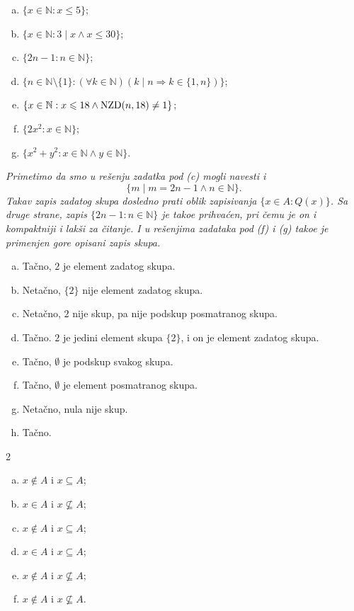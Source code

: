 {
\begin{enumerate}[(a)]
\item $\{ x\in\mathbb N :  x\leq 5 \}$;
\item $\{ x\in\mathbb N :  3\mid x\wedge x\leq 30 \}$;
\item $\{ 2n-1 :  n\in\mathbb N \}$;
\item $\{ n\in\mathbb N\setminus\{1\} : (\forall k\in\mathbb N)(k\mid n\Rightarrow k\in\{1,n\}) \}$;
\item $\{ x\in\mathbb N :  x\leqslant 18\wedge \mathrm{NZD}(n,18)\neq 1 \}$;
\item $\{ 2x^2 :  x\in\mathbb N \}$;
\item $\{ x^2+y^2 :  x\in\mathbb N\wedge y\in\mathbb N \}$.
\end{enumerate}
\begin{NAP}\it
Primetimo da smo u re\v senju zadatka pod (c) mogli navesti i 
\[\{m\mid m=2n-1\wedge n\in\mathbb N\}.\]
 Takav zapis zadatog skupa dosledno prati oblik zapisivanja $\{x\in A :  Q(x)\}$. Sa druge strane, zapis $\{ 2n-1 :  n\in\mathbb N \}$ je tako\dj e prihva\' cen, pri \v cemu je on i kompaktniji i lak\v si za \v citanje. I u re\v senjima zadataka pod (f) i (g) tako\dj e je primenjen gore opisani zapis skupa.
\end{NAP}

\begin{enumerate}[(a)]
\item Ta\v cno, $2$ je element zadatog skupa.
\item Neta\v cno, $\{2\}$ nije element zadatog skupa.
\item Neta\v cno, $2$ nije skup, pa nije podskup posmatranog skupa.
\item Ta\v cno. $2$ je jedini element skupa $\{2\}$, i on je element zadatog skupa. 
\item Ta\v cno, $\emptyset$ je podskup svakog skupa.
\item Ta\v cno, $\emptyset$ je element posmatranog skupa. 
\item Neta\v cno, nula nije skup.
\item Ta\v cno.
\end{enumerate}

\begin{multicols}{2}
\begin{enumerate}[(a)]
\item $x\not\in A$ i $x\subseteq A$;
\item $x\in A$ i $x\not\subseteq A$;
\item $x\not\in A$ i $x\subseteq A$;
\item $x\in A$ i $x\subseteq A$;
\item $x\not\in A$ i $x\not\subseteq A$;
\item $x\not\in A$ i $x\not\subseteq A$.
\end{enumerate}
\end{multicols}

}
